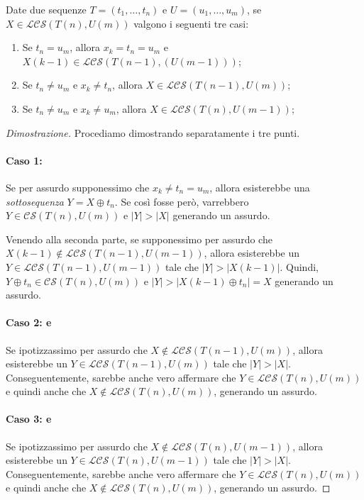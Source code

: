 \begin{definition}
    Date due sequenze $T=(t_1,\dots,t_n)$ e $U=(u_1,\dots,u_m)$, se $X\in
    \mathcal{LCS}(T(n),U(m))$ valgono i seguenti tre casi:
    \begin{enumerate}
        \item Se $t_n=u_m$, allora $x_k=t_n=u_m$ e $X(k-1)\in\mathcal{LCS}(T(n-1),
        (U(m-1)))$;
        \item Se $t_n\neq u_m$ e $x_k\neq t_n$, allora $X\in\mathcal{LCS}(T(n-1),U(m))$;
        \item Se $t_n\neq u_m$ e $x_k\neq u_m$, allora $X\in\mathcal{LCS}(T(n),U(m-1))$;
    \end{enumerate}
\end{definition}
\begin{proof}[Dimostrazione]
    Procediamo dimostrando separatamente i tre punti.
    \paragraph{Caso 1: } Se per assurdo supponessimo che $x_k\neq
    t_n=u_m$, allora esisterebbe una \emph{sottosequenza} $Y=X\oplus t_n$. Se così
    fosse però, varrebbero $Y\in\mathcal{CS}(T(n), U(m))$ e $|Y|>|X|$ generando
    un assurdo.

    Venendo alla seconda parte, se supponessimo per assurdo che $X(k-1)\notin
    \mathcal{LCS}(T(n-1),U(m-1))$, allora esisterebbe un $Y\in\mathcal{LCS}(T(n-1),
    U(m-1))$ tale che $|Y|>|X(k-1)|$. Quindi, $Y\oplus t_n\in\mathcal{CS}(T(n),
    U(m))$ e $|Y|>|X(k-1)\oplus t_n|=X$ generando un assurdo.
    \paragraph{Caso 2:  e } Se ipotizzassimo
    per assurdo che $X\notin\mathcal{LCS}(T(n-1),U(m))$, allora esisterebbe un
    $Y\in\mathcal{LCS}(T(n-1), U(m))$ tale che $|Y|>|X|$. Conseguentemente,
    sarebbe anche vero affermare che $Y\in\mathcal{LCS}(T(n),U(m))$ e quindi
    anche che $X\notin\mathcal{LCS}(T(n),U(m))$, generando un assurdo.

    \paragraph{Caso 3:  e } Se ipotizzassimo
    per assurdo che $X\notin\mathcal{LCS}(T(n),U(m-1))$, allora esisterebbe un
    $Y\in\mathcal{LCS}(T(n), U(m-1))$ tale che $|Y|>|X|$. Conseguentemente,
    sarebbe anche vero affermare che $Y\in\mathcal{LCS}(T(n),U(m))$ e quindi
    anche che $X\notin\mathcal{LCS}(T(n),U(m))$, generando un assurdo.
\end{proof}\noindent
